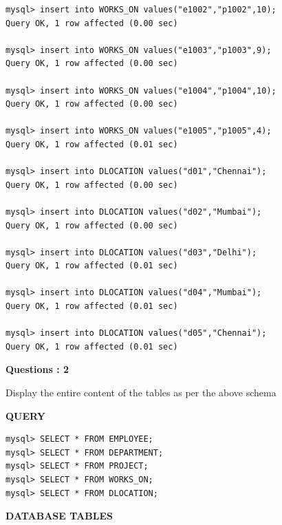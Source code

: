 \documentclass[a4paper,12pt]{report}
\begin{document}
\begin{verbatim}
mysql> insert into WORKS_ON values("e1002","p1002",10);
Query OK, 1 row affected (0.00 sec)

mysql> insert into WORKS_ON values("e1003","p1003",9);
Query OK, 1 row affected (0.00 sec)

mysql> insert into WORKS_ON values("e1004","p1004",10);
Query OK, 1 row affected (0.00 sec)

mysql> insert into WORKS_ON values("e1005","p1005",4);
Query OK, 1 row affected (0.01 sec)

mysql> insert into DLOCATION values("d01","Chennai");
Query OK, 1 row affected (0.00 sec)

mysql> insert into DLOCATION values("d02","Mumbai");
Query OK, 1 row affected (0.00 sec)

mysql> insert into DLOCATION values("d03","Delhi");
Query OK, 1 row affected (0.01 sec)

mysql> insert into DLOCATION values("d04","Mumbai");
Query OK, 1 row affected (0.01 sec)

mysql> insert into DLOCATION values("d05","Chennai");
Query OK, 1 row affected (0.01 sec)
\end{verbatim}

\begin{flushleft}
    \textbf{Questions : 2}
\end{flushleft}
Display the entire content of the tables as per the above schema
\begin{flushleft}
		\textbf{QUERY }
	\end{flushleft}
\begin{verbatim}
mysql> SELECT * FROM EMPLOYEE;
mysql> SELECT * FROM DEPARTMENT;
mysql> SELECT * FROM PROJECT;
mysql> SELECT * FROM WORKS_ON;
mysql> SELECT * FROM DLOCATION;

\end{verbatim}

\begin{flushleft}
		\textbf{DATABASE TABLES}
\end{flushleft} 
\end{document}
